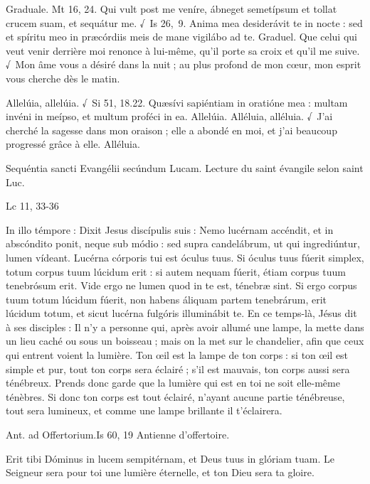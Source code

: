 \begin{paracol}{2}
Graduale. Mt 16, 24. Qui vult post me veníre, ábneget semetípsum et tollat crucem suam, et sequátur me. √~Is 26, 9. Anima mea desiderávit te in nocte : sed et spíritu meo in præcórdiis meis de mane vigilábo ad te.
\switchcolumn
Graduel. Que celui qui veut venir derrière moi renonce à lui-même, qu’il porte sa croix et qu’il me suive. √~Mon âme vous a désiré dans la nuit ; au plus profond de mon cœur, mon esprit vous cherche dès le matin.
\switchcolumn*

Allelúia, allelúia. √~Si 51, 18.22. Quæsívi sapiéntiam in oratióne mea : multam invéni in meípso, et multum proféci in ea. Allelúia.
\switchcolumn
Alléluia, alléluia. √~J’ai cherché la sagesse dans mon oraison ; elle a abondé en moi, et j’ai beaucoup progressé grâce à elle. Alléluia.
\switchcolumn*

Sequéntia sancti Evangélii secúndum Lucam.
\switchcolumn
Lecture du saint évangile selon saint Luc.
\switchcolumn*

Lc 11, 33-36
\switchcolumn

\switchcolumn*

In illo témpore : Dixit Jesus discípulis suis : Nemo lucérnam accéndit, et in abscóndito ponit, neque sub módio : sed supra candelábrum, ut qui ingrediúntur, lumen vídeant. Lucérna córporis tui est óculus tuus. Si óculus tuus fúerit simplex, totum corpus tuum lúcidum erit : si autem nequam fúerit, étiam corpus tuum tenebrósum erit. Vide ergo ne lumen quod in te est, ténebræ sint. Si ergo corpus tuum totum lúcidum fúerit, non habens áliquam partem tenebrárum, erit lúcidum totum, et sicut lucérna fulgóris illuminábit te.
\switchcolumn
En ce temps-là, Jésus dit à ses disciples : Il n’y a personne qui, après avoir allumé une lampe, la mette dans un lieu caché ou sous un boisseau ; mais on la met sur le chandelier, afin que ceux qui entrent voient la lumière. Ton œil est la lampe de ton corps : si ton œil est simple et pur, tout ton corps sera éclairé ; s’il est mauvais, ton corps aussi sera ténébreux. Prends donc garde que la lumière qui est en toi ne soit elle-même ténèbres. Si donc ton corps est tout éclairé, n’ayant aucune partie ténébreuse, tout sera lumineux, et comme une lampe brillante il t’éclairera.
\switchcolumn*

Ant. ad Offertorium.\hfill Is 60, 19
\switchcolumn
Antienne d’offertoire.
\switchcolumn*

Erit tibi Dóminus in lucem sempitérnam, et Deus tuus in glóriam tuam.
\switchcolumn
Le Seigneur sera pour toi une lumière éternelle, et ton Dieu sera ta gloire.
\switchcolumn*


\end{paracol}
